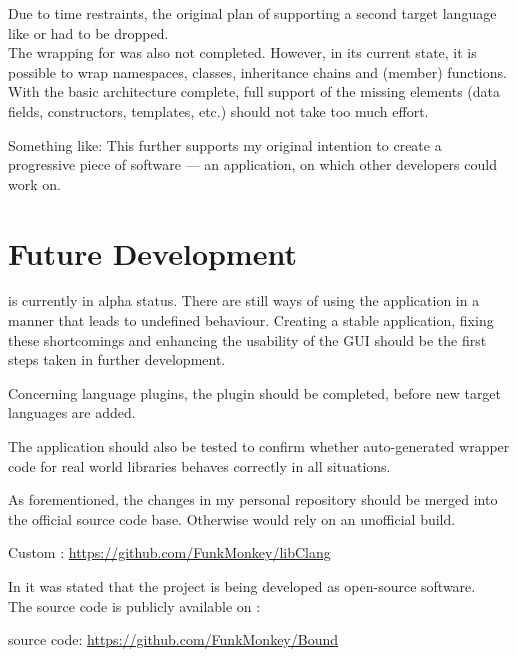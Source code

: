 Due to time restraints, the original plan of supporting a second target language like  or  had to be dropped.\\ The wrapping for  was also not completed. However, in its current state, it is possible to wrap namespaces, classes, inheritance chains and (member) functions.\\
With the basic architecture complete, full support of the missing elements (data fields, constructors, templates, etc.) should not take too much effort. 


Something like: This further supports my original intention to create a progressive piece of software --- an application, on which other developers could work on.

\chapter{Future Development}
\label{chap:FutureDevelopment}

 is currently in alpha status. There are still ways of using the application in a manner that leads to undefined behaviour. Creating a stable application, fixing these shortcomings and enhancing the usability of the GUI should be the first steps taken in further development.

Concerning language plugins, the  plugin should be completed, before new target languages are added.

The application should also be tested to confirm whether auto-generated wrapper code for real world libraries behaves correctly in all situations.

As forementioned, the changes in my personal  repository should be merged into the official source code base. Otherwise  would rely on an unofficial  build.

\hspace{20pt} Custom : \url{https://github.com/FunkMonkey/libClang}

In  it was stated that the project is being developed as open-source software.\\
The source code is publicly available on :

\hspace{20pt}  source code: \url{https://github.com/FunkMonkey/Bound}

